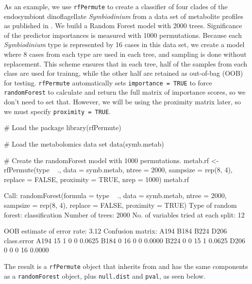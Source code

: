 As an example, we use \texttt{rfPermute} to create a classifier of four
clades of the endosymbiont dinoflagellate \emph{Symbiodinium} from a
data set of metabolite profiles as published in \citet{RN404}. We build
a Random Forest model with 2000 trees. Significance of the predictor
importances is measured with 1000 permutations. Because each
\emph{Symbiodinium} type is represented by 16 cases in this data set, we
create a model where 8 cases from each type are used in each tree, and
sampling is done without replacement. This scheme ensures that in each
tree, half of the samples from each class are used for trainng, while
the other half are retained as out-of-bag (OOB) for testing.
\texttt{rfPermute} automatically sets \texttt{importance\ =\ TRUE} to
force \texttt{randomForest} to calculate and return the full matrix of
importance scores, so we don't need to set that. However, we will be
using the proximity matrix later, so we must specify
\texttt{proximity\ =\ TRUE}.

\begin{Schunk}
\begin{Sinput}
# Load the package
library(rfPermute)
\end{Sinput}
\end{Schunk}\begin{Schunk}
\begin{Sinput}
# Load the metabolomics data set
data(symb.metab)

# Create the randomForest model with 1000 permutations.
metab.rf <- rfPermute(type ~ ., data = symb.metab, ntree = 2000, sampsize = rep(8, 
    4), replace = FALSE, proximity = TRUE, nrep = 1000)
metab.rf
\end{Sinput}
\begin{Soutput}

Call:
 randomForest(formula = type ~ ., data = symb.metab, ntree = 2000,      sampsize = rep(8, 4), replace = FALSE, proximity = TRUE) 
               Type of random forest: classification
                     Number of trees: 2000
No. of variables tried at each split: 12

        OOB estimate of  error rate: 3.12%
Confusion matrix:
     A194 B184 B224 D206 class.error
A194   15    1    0    0      0.0625
B184    0   16    0    0      0.0000
B224    0    0   15    1      0.0625
D206    0    0    0   16      0.0000
\end{Soutput}
\end{Schunk}

The result is a \texttt{rfPermute} object that inherits from and has the
same components as a \texttt{randomForest} object, plus
\texttt{null.dist} and \texttt{pval}, as seen below.

